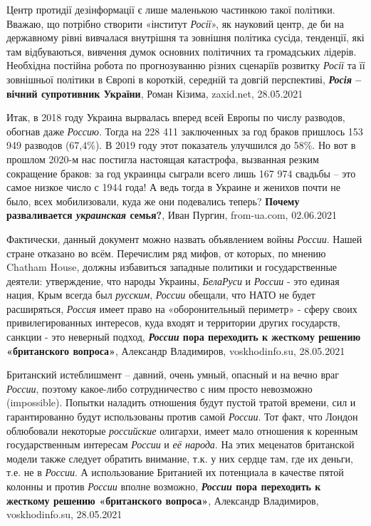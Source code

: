 Центр протидії дезінформації є лише маленькою частинкою такої політики. Вважаю,
що потрібно створити «інститут \emph{Росії}», як науковий центр, де би на державному
рівні вивчалася внутрішня та зовнішня політика сусіда, тенденції, які там
відбуваються, вивчення думок основних політичних та громадських лідерів.
Необхідна постійна робота по прогнозуванню різних сценаріїв розвитку \emph{Росії} та
її зовнішньої політики в Європі в короткій, середній та довгій перспективі,
\textbf{\emph{Росія} – вічний супротивник України}, Роман Кізима, zaxid.net, 28.05.2021

Итак, в 2018 году Украина вырвалась вперед всей Европы по числу разводов,
обогнав даже \emph{Россию}. Тогда на 228 411 заключенных за год браков пришлось
153 949 разводов (67,4\%). В 2019 году этот показатель улучшился до 58\%. Но
вот в прошлом 2020-м нас постигла настоящая катастрофа, вызванная резким
сокращение браков: за год украинцы сыграли всего лишь 167 974 свадьбы – это
самое низкое число с 1944 года! А ведь тогда в Украине и женихов почти не было,
всех мобилизовали, куда же они подевались теперь?
\textbf{Почему разваливается \emph{украинская} семья?}, Иван Пургин, from-ua.com, 02.06.2021

Фактически, данный документ можно назвать объявлением войны \emph{России}. Нашей
стране отказано во всём. Перечислим ряд мифов, от которых, по мнению  Chatham
House, должны избавиться западные политики и государственные деятели:
утверждение, что народы Украины, \emph{БелаРуси} и \emph{России} - это единая нация, Крым
всегда был \emph{русским}, \emph{России} обещали, что НАТО не будет расширяться, \emph{Россия} имеет
право на «оборонительный периметр» - сферу своих привилегированных интересов,
куда входят и территории других государств, санкции - это неверный подход,
\textbf{\emph{России} пора переходить к жесткому решению «британского вопроса»}, 
Александр Владимиров, voskhodinfo.su, 28.05.2021

Британский истеблишмент – давний, очень умный, опасный и на вечно враг \emph{России},
поэтому какое-либо сотрудничество с ним просто невозможно (impossible). Попытки
наладить отношения будут пустой тратой времени, сил и гарантированно будут
использованы против самой \emph{России}.  Тот факт, что Лондон облюбовали некоторые
\emph{российские} олигархи, имеет мало отношения к коренным государственным интересам
\emph{России} и \emph{её народа}. На этих меценатов британской модели также следует обратить
внимание, т.к. у них сердце там, где их деньги, т.е. не в \emph{России}. А
использование Британией их потенциала в качестве пятой колонны и против \emph{России}
вполне возможно,
\textbf{\emph{России} пора переходить к жесткому решению «британского вопроса»}, 
Александр Владимиров, voskhodinfo.su, 28.05.2021

